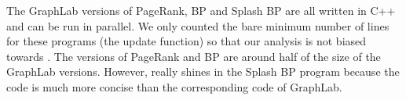 The GraphLab versions of PageRank, BP and Splash BP are all written in C++ and can be run in
parallel. We only counted the bare minimum number of lines for these programs (the update function)
so that our analysis is not biased towards \lang. The \lang versions of PageRank and BP are around
half of the size of the GraphLab versions. However, \lang really shines in the Splash BP program because
the code is much more concise than the corresponding code of GraphLab.